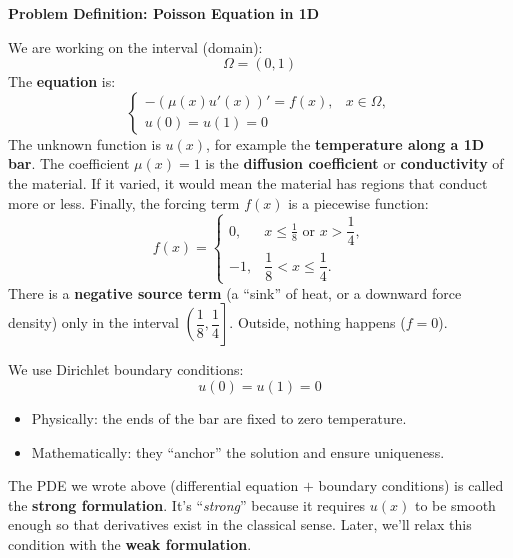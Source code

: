 \begin{flushleft}
    \textcolor{Green3}{ \textbf{Problem Definition: Poisson Equation in 1D}}
\end{flushleft}
We are working on the interval (domain):
\begin{equation*}
    \Omega = (0,1)
\end{equation*}
The \textbf{equation} is:
\begin{equation*}
    \begin{cases}
        - \left(\mu(x) u'(x)\right)' = f(x), & x \in \Omega, \\[.5em]
        u(0) = u(1) = 0 &
    \end{cases}
\end{equation*}
The unknown function is $u(x)$, for example the \textbf{temperature along a 1D bar}. The coefficient $\mu(x) = 1$ is the \textbf{diffusion coefficient} or \textbf{conductivity} of the material. If it varied, it would mean the material has regions that conduct more or less. Finally, the forcing term $f(x)$ is a piecewise function:
\begin{equation*}
    f(x) = 
    \begin{cases}
        0,  & x \leq \tfrac{1}{8} \text{ or } x > \dfrac{1}{4}, \\[.5em]
        -1, & \dfrac{1}{8} < x \leq \dfrac{1}{4}.
    \end{cases}
\end{equation*}
There is a \textbf{negative source term} (a ``sink'' of heat, or a downward force density) only in the interval $\left.\left( \dfrac{1}{8}, \dfrac{1}{4} \right.\right]$. Outside, nothing happens ($f = 0$).

\highspace
We use Dirichlet boundary conditions:
\begin{equation*}
    u(0) = u(1) = 0
\end{equation*}
\begin{itemize}
    \item Physically: the ends of the bar are fixed to zero temperature.
    \item Mathematically: they ``anchor'' the solution and ensure uniqueness.
\end{itemize}
The PDE we wrote above (differential equation $+$ boundary conditions) is called the \textbf{strong formulation}. It's ``\emph{strong}'' because it requires $u(x)$ to be smooth enough so that derivatives exist in the classical sense. Later, we'll relax this condition with the \textbf{weak formulation}.

